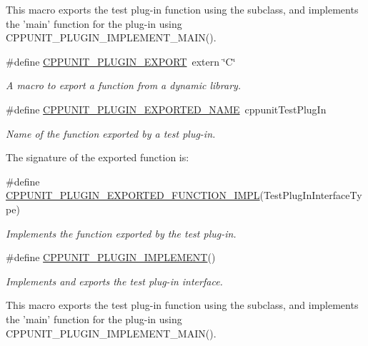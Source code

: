 \begin{DoxyCompactItemize}
\begin{DoxyCompactList}
This macro exports the test plug-\/in function using the subclass, and implements the 'main' function for the plug-\/in using C\+P\+P\+U\+N\+I\+T\+\_\+\+P\+L\+U\+G\+I\+N\+\_\+\+I\+M\+P\+L\+E\+M\+E\+N\+T\+\_\+\+M\+A\+I\+N(). \end{DoxyCompactList}\item 
\#define \hyperlink{group___writing_test_plug_in_ga477408f06c41af1d46b8f17f21b3b5d6}{C\+P\+P\+U\+N\+I\+T\+\_\+\+P\+L\+U\+G\+I\+N\+\_\+\+E\+X\+P\+O\+R\+T}~extern \char`\"{}C\char`\"{}
\begin{DoxyCompactList}\small\item\em A macro to export a function from a dynamic library. \end{DoxyCompactList}\item 
\#define \hyperlink{group___writing_test_plug_in_gae7a1d474c7762e1bed3972b3d8fc11d6}{C\+P\+P\+U\+N\+I\+T\+\_\+\+P\+L\+U\+G\+I\+N\+\_\+\+E\+X\+P\+O\+R\+T\+E\+D\+\_\+\+N\+A\+M\+E}~cppunit\+Test\+Plug\+In
\begin{DoxyCompactList}\small\item\em Name of the function exported by a test plug-\/in.

The signature of the exported function is\+: \end{DoxyCompactList}\item 
\#define \hyperlink{group___writing_test_plug_in_ga81bfba0323e2c7ca7dfd6767db813a5b}{C\+P\+P\+U\+N\+I\+T\+\_\+\+P\+L\+U\+G\+I\+N\+\_\+\+E\+X\+P\+O\+R\+T\+E\+D\+\_\+\+F\+U\+N\+C\+T\+I\+O\+N\+\_\+\+I\+M\+P\+L}(Test\+Plug\+In\+Interface\+Type)
\begin{DoxyCompactList}\small\item\em Implements the function exported by the test plug-\/in. \end{DoxyCompactList}\item 
\#define \hyperlink{group___writing_test_plug_in_ga705897c323d9381ac1b99a45e953e4ff}{C\+P\+P\+U\+N\+I\+T\+\_\+\+P\+L\+U\+G\+I\+N\+\_\+\+I\+M\+P\+L\+E\+M\+E\+N\+T}()
\begin{DoxyCompactList}\small\item\em Implements and exports the test plug-\/in interface.

This macro exports the test plug-\/in function using the subclass, and implements the 'main' function for the plug-\/in using C\+P\+P\+U\+N\+I\+T\+\_\+\+P\+L\+U\+G\+I\+N\+\_\+\+I\+M\+P\+L\+E\+M\+E\+N\+T\+\_\+\+M\+A\+I\+N(). \end{DoxyCompactList}\end{DoxyCompactItemize}
